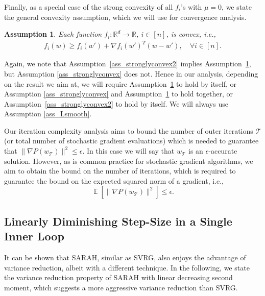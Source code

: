 \documentclass{article}
\newtheorem{ass}{Assumption}
\newcommand{\tc}[1]{\textcolor{Magenta}{\bf #1}}
\DeclareMathOperator{\Exp}{\mathbb{E}}           %
\newcommand{\setn}{[n]}
\renewcommand{\top}{T}
\begin{document}

Finally, as a special case of the strong convexity of all $f_i$'s with $\mu=0$, we state the general convexity assumption, which we will use for convergence analysis.
\begin{ass}
\label{ass_convex}
Each function $f_i: \mathbb{R}^d \to \mathbb{R}$, $i \in \setn$, is convex, i.e.,
\begin{gather*}
f_i(w)    \geq f_i(w') + \nabla f_i(w')^\top (w - w'), \quad \forall i\in\setn. 
\end{gather*}
\end{ass}
Again, we note that Assumption~\ref{ass_stronglyconvex2} implies Assumption~\ref{ass_convex}, but Assumption  \ref{ass_stronglyconvex} does not.
Hence in our analysis, depending on the result we aim at, we will require Assumption~\ref{ass_convex} to hold by itself, or Assumption  \ref{ass_stronglyconvex}  and Assumption~\ref{ass_convex} to hold together, or Assumption~\ref{ass_stronglyconvex2} to hold by itself. We will always use Assumption  \ref{ass_Lsmooth}. 



Our iteration complexity analysis aims to bound the number of outer iterations $\mathcal{T}$ (or total number of stochastic gradient evaluations) which is needed to  guarantee that 
$\|\nabla P(w_\mathcal{T})\|^2\leq \epsilon$. In this case we will say that $w_\mathcal{T}$ is an $\epsilon$-accurate solution. 
However, as is  common practice for  
stochastic gradient
 algorithms, we aim to obtain the bound on the number of iterations, which is required to guarantee the bound on the expected squared norm of a gradient, i.e.,
\begin{equation}\label{eq:accuracy}
\Exp [\| \nabla P(w_\mathcal{T}) \|^2] \leq \epsilon.
\end{equation}

\subsection{Linearly Diminishing Step-Size  in a Single Inner Loop}\label{sec:linearconvergence}

\iffalse
It can be shown that SARAH, similar as SVRG, also enjoys the advantage of variance reduction, albeit with a different technique. In the following, we state the variance reduction property of SARAH with linear decreasing second moment, which suggests a more aggressive variance reduction than SVRG. 
\end{document}
